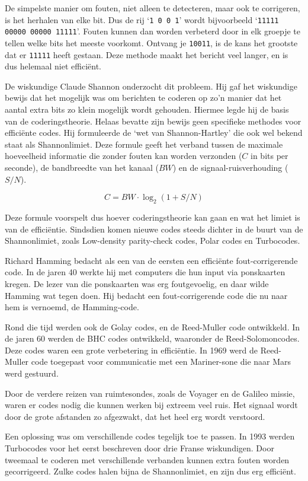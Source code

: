 \documentclass[a4paper]{article}
\begin{document}
De simpelste manier om fouten, niet alleen te detecteren, maar ook te corrigeren, is het herhalen van elke bit. Dus de rij ‘\texttt{1 0 0 1}’ wordt bijvoorbeeld ‘\texttt{11111 00000 00000 11111}’. Fouten kunnen dan worden verbeterd door in elk groepje te tellen welke bits het meeste voorkomt. Ontvang je \texttt{10011}, is de kans het grootste dat er \texttt{11111} heeft gestaan. Deze methode maakt het bericht veel langer, en is dus helemaal niet efficiënt.

De wiskundige Claude Shannon onderzocht dit probleem. Hij gaf het wiskundige bewijs dat het mogelijk was om berichten te coderen op zo'n manier dat het aantal extra bits zo klein mogelijk wordt gehouden. Hiermee legde hij de basis van de coderingstheorie. Helaas bevatte zijn bewijs geen specifieke methodes voor efficiënte codes. Hij formuleerde de `wet van Shannon-Hartley' die ook wel bekend staat als Shannonlimiet.
Deze formule geeft het verband tussen de maximale hoeveelheid informatie die zonder fouten kan worden verzonden ($C$ in bits per seconde), de bandbreedte van het kanaal ($BW$) en de signaal-ruisverhouding ($S/N$).

$$C = BW \cdot \log_2(1+S/N)$$

Deze formule voorspelt dus hoever coderingstheorie kan gaan en wat het limiet is van de efficiëntie. Sindsdien komen nieuwe codes steeds dichter in de buurt van de Shannonlimiet, zoals Low-density parity-check codes, Polar codes en Turbocodes.

Richard Hamming bedacht als een van de eersten een efficiënte fout-corrigerende code. In de jaren 40 werkte hij met computers die hun input via ponskaarten kregen. De lezer van die ponskaarten was erg foutgevoelig, en daar wilde Hamming wat tegen doen. Hij bedacht een fout-corrigerende code die nu naar hem is vernoemd, de Hamming-code.

Rond die tijd werden ook de Golay codes, en de Reed-Muller code ontwikkeld. In de jaren 60 werden de BHC codes ontwikkeld, waaronder de Reed-Solomoncodes. Deze codes waren een grote verbetering in efficiëntie. In 1969 werd de Reed-Muller code toegepast voor communicatie met een Mariner-sone die naar Mars werd gestuurd.

Door de verdere reizen van ruimtesondes, zoals de Voyager en de Galileo missie, waren er codes nodig die kunnen werken bij extreem veel ruis. Het signaal wordt door de grote afstanden zo afgezwakt, dat het heel erg wordt verstoord.

Een oplossing was om verschillende codes tegelijk toe te passen. In 1993 werden Turbocodes voor het eerst beschreven door drie Franse wiskundigen. Door tweemaal te coderen met verschillende verbanden kunnen extra fouten worden gecorrigeerd. Zulke codes halen bijna de Shannonlimiet, en zijn dus erg efficiënt.
\end{document}
